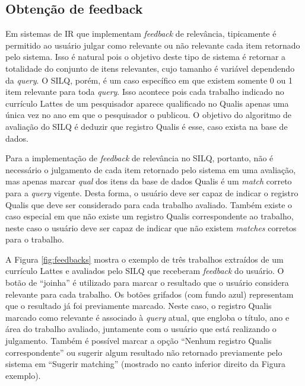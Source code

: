\documentclass[12pt]{article}
\newcommand{\quotes}[1]{``#1''}
\begin{document}
\subsection{Obtenção de feedback} \label{sec:feedback}

Em sistemas de IR que implementam \textit{feedback} de relevância, tipicamente é permitido ao usuário julgar como relevante ou não relevante cada item retornado pelo sistema. Isso é natural pois o objetivo deste tipo de sistema é retornar a totalidade do conjunto de itens relevantes, cujo tamanho é variável dependendo da \textit{query}. O SILQ, porém, é um caso específico em que existem somente 0 ou 1 item relevante para toda \textit{query}. Isso acontece pois cada trabalho indicado no currículo Lattes de um pesquisador aparece qualificado no Qualis apenas uma única vez no ano em que o pesquisador o publicou. O objetivo do algoritmo de avaliação do SILQ é deduzir que registro Qualis é esse, caso exista na base de dados.

Para a implementação de \textit{feedback} de relevância no SILQ, portanto, não é necessário o julgamento de cada item retornado pelo sistema em uma avaliação, mas apenas marcar \textit{qual} dos itens da base de dados Qualis é um \textit{match} correto para a \textit{query} vigente. Desta forma, o usuário deve ser capaz de indicar o registro Qualis que deve ser considerado para cada trabalho avaliado. Também existe o caso especial em que não existe um registro Qualis correspondente ao trabalho, neste caso o usuário deve ser capaz de indicar que não existem \textit{matches} corretos para o trabalho.

A Figura \ref{fig:feedbacks} mostra o exemplo de três trabalhos extraídos de um currículo Lattes e avaliados pelo SILQ que receberam \textit{feedback} do usuário. O botão de \quotes{joinha} é utilizado para marcar o resultado que o usuário considera relevante para cada trabalho. Os botões grifados (com fundo azul) representam que o resultado já foi previamente marcado. Neste caso, o registro Qualis marcado como relevante é associado à \textit{query} atual, que engloba o título, ano e área do trabalho avaliado, juntamente com o usuário que está realizando o julgamento. Também é possível marcar a opção \quotes{Nenhum registro Qualis correspondente} ou sugerir algum resultado não retornado previamente pelo sistema em \quotes{Sugerir matching} (mostrado no canto inferior direito da Figura exemplo).
\end{document}
